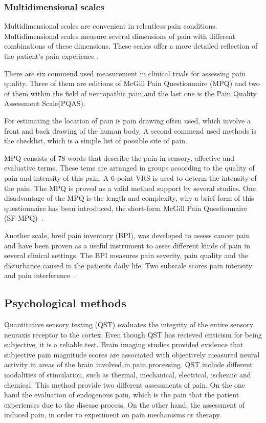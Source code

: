 \subsubsection{Multidimensional scales}

Multidimensional scales are convenient in relentless pain conditions. Multidimensional scales measure several dimensions of pain with different combinations of these dimensions. These scales offer a more detailed reflection of the patient's pain experience \cite{Briggs2010}. 

There are six commend used measurement in clinical trials for assessing pain quality. Three of them are editions of McGill Pain Questionnaire (MPQ) and two of them within the field of neuropathic pain and the last one is the Pain Quality Assessment Scale(PQAS). 

For estimating the location of pain is pain drawing often used, which involve a front and back drawing of the human body. A second commend used methods is the checklist, which is a simple list of possible site of pain. 

MPQ consists of 78 words that describe the pain in sensory, affective and evaluative terms. These tems are arranged in groups acoording to the quality of pain and intensity of this pain. A 6-point VRS is used to determ the intensity of the pain. The MPQ is proved as a valid method support by several studies.  One disadvantage of the MPQ is the length and complexity, why a brief form of this questionnaire has been introduced, the short-form McGill Pain Questionnaire (SF-MPQ)~\cite{Katz2001}. 

Another scale, breif pain inventory (BPI), was developed to assess cancer pain and have been proven as a useful instrument to asses different kinds of pain in several clinical settings. The BPI measures pain severity, pain quality and the disturbance caused in the patients daily life. Two subscale scores pain intensity and pain interference~\cite{Katz2001}.  

\subsection{Psychological methods}
Quantitative sensory testing (QST) evaluates the integrity of the entire sensory neuraxis receptor to the cortex. Even though QST has recieved criticism for being subjective, it is a reliable test. Brain imaging studies provided evidence that subjective pain magnitude scores are associated with objectively measured neural activity in areas of the brain involved in pain processing. QST include different modalities of stimulation, such as thermal, mechanical, electrical, ischemic and chemical. This method provide two different assessments of pain. On the one hand the  evaluation of endogenous pain, which is the pain that the patient experiences due to the disease process. On the other hand, the assessment of induced pain, in order to experiment on pain mechanisms or therapy. \cite{Yarnitsky2006}

